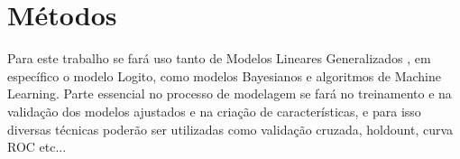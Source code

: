 \documentclass[
12pt,				%
openright,			%
oneside,			%
a4paper,			%
english,			%
brazil,				%
]{abntex2}
\begin{document}
\section{Métodos}
\label{sec:metodos}

Para este trabalho se fará uso tanto de Modelos Lineares Generalizados \cite{nelder1972generalized}, em
específico o modelo Logito, como modelos Bayesianos e algoritmos de Machine
Learning. Parte essencial no processo de modelagem se fará no treinamento e na
validação dos modelos ajustados e na criação de características, e para isso
diversas técnicas poderão ser utilizadas como validação cruzada, holdount, curva
ROC etc...



\end{document}
